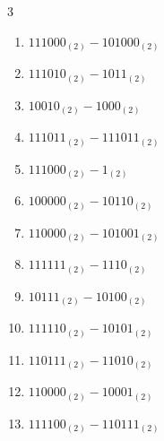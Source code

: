 \begin{multicols}{3}
\begin{enumerate}
\columnbreak %

  \item $111000_{(2)} - 101000_{(2)}$


  \item $111010_{(2)} - 1011_{(2)}$


  \item $10010_{(2)} - 1000_{(2)}$


  \item $111011_{(2)} - 111011_{(2)}$


  \item $111000_{(2)} - 1_{(2)}$


  \item $100000_{(2)} - 10110_{(2)}$


  \item $110000_{(2)} - 101001_{(2)}$


  \item $111111_{(2)} - 1110_{(2)}$


  \item $10111_{(2)} - 10100_{(2)}$


  \item $111110_{(2)} - 10101_{(2)}$


\columnbreak %

  \item $110111_{(2)} - 11010_{(2)}$


  \item $110000_{(2)} - 10001_{(2)}$


  \item $111100_{(2)} - 110111_{(2)}$



\end{enumerate}
\end{multicols}
